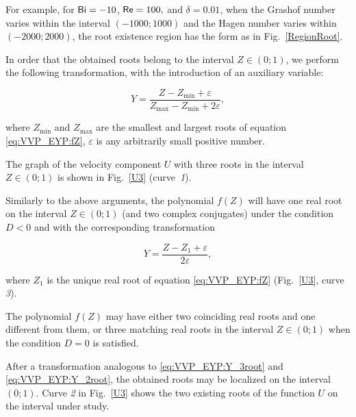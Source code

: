  

 \noindent

For example, for ${\sf Bi}=-10$, ${\sf Re}=100,$ and $\delta=0.01$, when the Grashof number varies within the interval $(-1000;1000)$  and the Hagen number varies within $(-2000;2000)$, the root existence region has the form as in Fig.~\ref{RegionRoot}.

In order that the obtained roots belong to the interval $Z\in \left(0;1\right)$, we perform the following transformation, with the introduction of an auxiliary variable:

\begin{equation}

       \label{eq:VVP_EYP:Y_3root}

Y=\frac{Z-Z_{\min}+\varepsilon}{Z_{\max}-Z_{\min}+2\varepsilon},

 \end{equation}

 where $Z_{\min}$ and $Z_{\max}$ are the smallest and largest roots of equation \eqref{eq:VVP_EYP:fZ}, $\varepsilon$ is any arbitrarily small positive number.

 

 

The graph of the velocity component $U$ with three roots in the interval $Z\in (0; 1)$ is shown in Fig.~\ref{U3} (curve~{\sl 1}).







Similarly to the above arguments, the polynomial $f(Z)$ will have one real root on the interval $Z\in \left(0;1\right)$ (and two complex conjugates) under the condition $D<0$ and with the corresponding transformation

\begin{equation}

       \label{eq:VVP_EYP:Y_2root}

Y=\frac{Z-Z_1+\varepsilon}{2\varepsilon},

 \end{equation}

where $Z_1$ is the unique real root of equation \eqref{eq:VVP_EYP:fZ} (Fig.~\ref{U3}, curve {\sl 3}\/).



The polynomial $f(Z)$ may have either two coinciding real roots and one different from them, or three matching real roots in the interval $Z\in  (0; 1 )$ when the condition $D=0$ is satisfied. 

After a transformation analogous to \eqref{eq:VVP_EYP:Y_3root} and \eqref{eq:VVP_EYP:Y_2root}, the obtained roots may be localized on the interval $ (0; 1 )$. Curve {\sl 2} in Fig.~\ref{U3} shows the two existing roots of the function $U$ on the interval under study.





